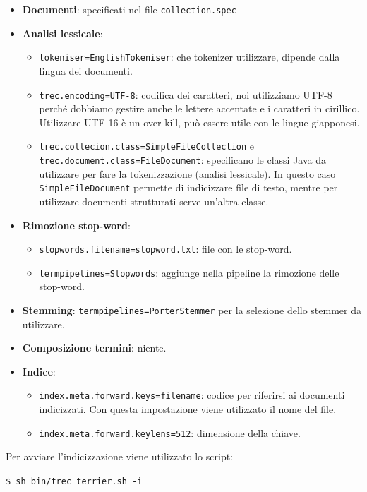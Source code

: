 \begin{itemize}
	\item \textbf{Documenti}: specificati nel file \texttt{collection.spec}
	\item \textbf{Analisi lessicale}:
	\begin{itemize}
		\item \texttt{tokeniser=EnglishTokeniser}: che tokenizer utilizzare, dipende dalla lingua dei documenti.
		\item \texttt{trec.encoding=UTF-8}: codifica dei caratteri, noi utilizziamo UTF-8 perché dobbiamo gestire anche le lettere accentate e i caratteri in cirillico. Utilizzare UTF-16 è un over-kill, può essere utile con le lingue giapponesi.
		\item \texttt{trec.collecion.class=SimpleFileCollection} e \texttt{trec.document.class=FileDocument}: specificano le classi Java da utilizzare per fare la tokenizzazione (analisi lessicale). In questo caso \texttt{SimpleFileDocument} permette di indicizzare file di testo, mentre per utilizzare documenti strutturati serve un'altra classe.
	\end{itemize}
	\item \textbf{Rimozione stop-word}:
	\begin{itemize}
		\item \texttt{stopwords.filename=stopword.txt}: file con le stop-word.
		\item \texttt{termpipelines=Stopwords}: aggiunge nella pipeline la rimozione delle stop-word.
	\end{itemize}
	\item \textbf{Stemming}: \texttt{termpipelines=PorterStemmer} per la selezione dello stemmer da utilizzare.
	\item \textbf{Composizione termini}: niente.
	\item \textbf{Indice}:
	\begin{itemize}
		\item \texttt{index.meta.forward.keys=filename}: codice per riferirsi ai documenti indicizzati. Con questa impostazione viene utilizzato il nome del file.
		\item \texttt{index.meta.forward.keylens=512}: dimensione della chiave.
	\end{itemize}
\end{itemize}

\noindent Per avviare l'indicizzazione viene utilizzato lo script:

\begin{center}
	\texttt{\$ sh bin/trec\_terrier.sh -i}
\end{center}

